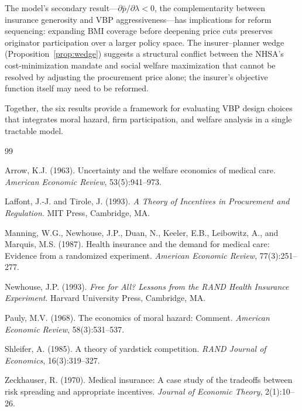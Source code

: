 \documentclass[12pt]{article}
\theoremstyle{plain}
\theoremstyle{definition}
\theoremstyle{remark}
\newcommand{\pbar}{\bar{p}}
\newcommand{\1}{\mathbf{1}}
\begin{document}
The model's secondary result---$\partial\pbar/\partial\lambda < 0$, the complementarity between insurance generosity and VBP aggressiveness---has implications for reform sequencing: expanding BMI coverage before deepening price cuts preserves originator participation over a larger policy space. The insurer--planner wedge (Proposition~\ref{prop:wedge}) suggests a structural conflict between the NHSA's cost-minimization mandate and social welfare maximization that cannot be resolved by adjusting the procurement price alone; the insurer's objective function itself may need to be reformed.

Together, the six results provide a framework for evaluating VBP design choices that integrates moral hazard, firm participation, and welfare analysis in a single tractable model.

\begin{thebibliography}{99}

Arrow, K.J. (1963).
\newblock Uncertainty and the welfare economics of medical care.
\newblock \emph{American Economic Review}, 53(5):941--973.

Laffont, J.-J. and Tirole, J. (1993).
\newblock \emph{A Theory of Incentives in Procurement and Regulation}.
\newblock MIT Press, Cambridge, MA.

Manning, W.G., Newhouse, J.P., Duan, N., Keeler, E.B., Leibowitz, A., and Marquis, M.S. (1987).
\newblock Health insurance and the demand for medical care: Evidence from a randomized experiment.
\newblock \emph{American Economic Review}, 77(3):251--277.

Newhouse, J.P. (1993).
\newblock \emph{Free for All? Lessons from the RAND Health Insurance Experiment}.
\newblock Harvard University Press, Cambridge, MA.

Pauly, M.V. (1968).
\newblock The economics of moral hazard: Comment.
\newblock \emph{American Economic Review}, 58(3):531--537.

Shleifer, A. (1985).
\newblock A theory of yardstick competition.
\newblock \emph{RAND Journal of Economics}, 16(3):319--327.

Zeckhauser, R. (1970).
\newblock Medical insurance: A case study of the tradeoffs between risk spreading and appropriate incentives.
\newblock \emph{Journal of Economic Theory}, 2(1):10--26.

\end{thebibliography}
\end{document}
